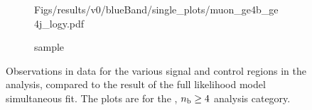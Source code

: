 \begin{figure}[h!]
\begin{subfigure}[b]{0.48\textwidth}
    {Figs/results/v0/blueBand/single_plots/muon_ge4b_ge4j_logy.pdf}
    \caption{\mj sample}
  \end{subfigure}
  \caption{Observations in data for the various signal and control
  regions in the analysis, compared to the result of the full likelihood model
  simultaneous fit. The plots are for the \njhigh, $n_{\text{b}} \geq 4$ analysis category.}
  \label{fig:blue_fits_ge4b_ge4j}
\end{figure}
